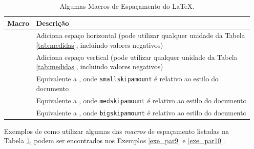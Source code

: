 \begin{table}[H]
\centering
\caption{Algumas Macros de Espaçamento do \LaTeX{}.}
\label{tab:espacamentos}
    \begin{tabular}{p{2.5cm}p{10.5cm}}
    \toprule
    \textbf{Macro} & \textbf{Descrição} \\
	\midrule
    \texttt{\hspace}    & Adiciona espaço horizontal (pode utilizar qualquer unidade da Tabela \ref{tab:medidas}, incluindo valores negativos) \\
    \texttt{\vspace}    & Adiciona espaço vertical (pode utilizar qualquer unidade da Tabela \ref{tab:medidas}, incluindo valores negativos)\\
    \texttt{\smallskip} & Equivalente a \texttt{\vspace{smallskipamount}}, onde {\tt smallskipamount} é relativo ao estilo do documento \\
    \texttt{\medskip}   & Equivalente a \texttt{\vspace{medskipamount}}, onde {\tt medskipamount} é relativo ao estilo do documento \\
    \texttt{\bigskip}   & Equivalente a \texttt{\vspace{bigskipamount}}, onde {\tt bigskipamount} é relativo ao estilo do documento \\
    \bottomrule
    \end{tabular}
\end{table}


%

Exemplos de como utilizar algumas das \textit{macros} de espaçamento listadas na Tabela \ref{tab:espacamentos}, podem ser encontrados nos Exemplos \ref{exe_par9} e \ref{exe_par10}.

